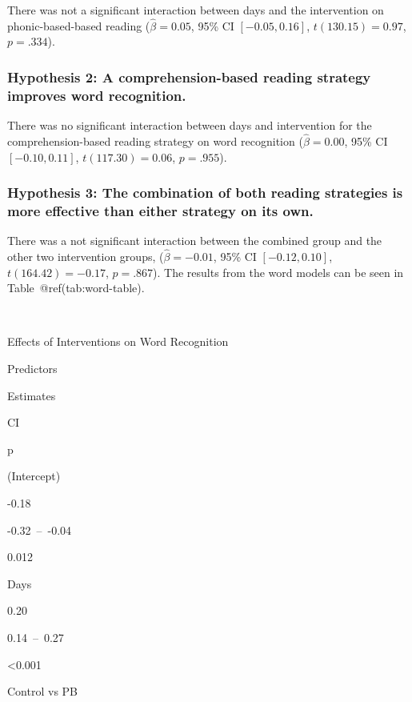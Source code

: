 \documentclass[
  ,
]{article}
\begin{document}
There was not a significant interaction between days and the
intervention on phonic-based-based reading (\(\hat{\beta} = 0.05\), 95\%
CI \([-0.05, 0.16]\), \(t(130.15) = 0.97\), \(p = .334\)).

\hypertarget{hypothesis-2-a-comprehension-based-reading-strategy-improves-word-recognition.}{%
\subsubsection{Hypothesis 2: A comprehension-based reading strategy
improves word
recognition.}\label{hypothesis-2-a-comprehension-based-reading-strategy-improves-word-recognition.}}

There was no significant interaction between days and intervention for
the comprehension-based reading strategy on word recognition
(\(\hat{\beta} = 0.00\), 95\% CI \([-0.10, 0.11]\),
\(t(117.30) = 0.06\), \(p = .955\)).

\hypertarget{hypothesis-3-the-combination-of-both-reading-strategies-is-more-effective-than-either-strategy-on-its-own.-1}{%
\subsubsection{Hypothesis 3: The combination of both reading strategies
is more effective than either strategy on its
own.}\label{hypothesis-3-the-combination-of-both-reading-strategies-is-more-effective-than-either-strategy-on-its-own.-1}}

There was a not significant interaction between the combined group and
the other two intervention groups, (\(\hat{\beta} = -0.01\), 95\% CI
\([-0.12, 0.10]\), \(t(164.42) = -0.17\), \(p = .867\)). The results
from the word models can be seen in Table~@ref(tab:word-table).

~

Effects of Interventions on Word Recognition

Predictors

Estimates

CI

p

(Intercept)

-0.18

-0.32~--~-0.04

0.012

Days

0.20

0.14~--~0.27

\textless0.001

Control vs PB
\end{document}
